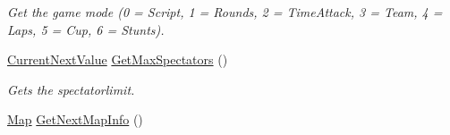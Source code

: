 \begin{DoxyCompactItemize}
\begin{DoxyCompactList}\small\item\em Get the game mode (0 = Script, 1 = Rounds, 2 = Time\-Attack, 3 = Team, 4 = Laps, 5 = Cup, 6 = Stunts). \end{DoxyCompactList}\item 
\hypertarget{classMethods_acd5073d1575cc885e2de00faabaca50e}{\hyperlink{structCurrentNextValue}{Current\-Next\-Value} \hyperlink{classMethods_acd5073d1575cc885e2de00faabaca50e}{Get\-Max\-Spectators} ()}\label{classMethods_acd5073d1575cc885e2de00faabaca50e}

\begin{DoxyCompactList}\small\item\em Gets the spectatorlimit. \end{DoxyCompactList}\item 
\hypertarget{classMethods_afa0e3e406c14aad10521d4d6c6333a70}{\hyperlink{structMap}{Map} \hyperlink{classMethods_afa0e3e406c14aad10521d4d6c6333a70}{Get\-Next\-Map\-Info} ()}\label{classMethods_afa0e3e406c14aad10521d4d6c6333a70}


\end{DoxyCompactItemize}
